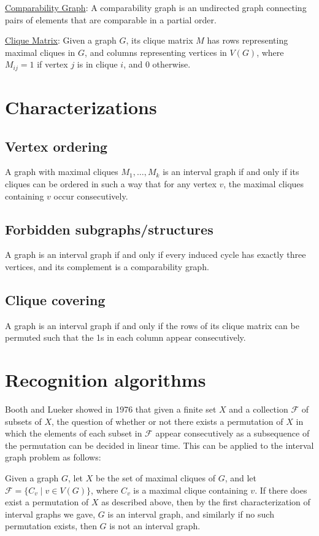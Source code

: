 \documentclass[11pt]{article}
\begin{document}
\noindent
\underline{Comparability Graph}: A comparability graph is an undirected graph
connecting pairs of elements that are comparable in a partial order.

\noindent
\underline{Clique Matrix}: Given a graph $G$, its clique matrix $M$ has rows
representing maximal cliques in $G$, and columns representing vertices in
$V(G)$, where $M_{ij}=1$ if vertex $j$ is in clique $i$, and 0 otherwise.


\section{Characterizations}
\subsection{Vertex ordering}
A graph with maximal cliques $M_1,\ldots,M_k$ is an interval graph if and only
if its cliques can be ordered in such a way that for any vertex $v$, the
maximal cliques containing $v$ occur consecutively. \cite{Golumbic}


\subsection{Forbidden subgraphs/structures}
A graph is an interval graph if and only if every induced cycle has exactly
three vertices, and its complement is a comparability graph. \cite{West}


\subsection{Clique covering}
A graph is an interval graph if and only if the rows of its clique matrix can
be permuted such that the 1s in each column appear consecutively. \cite{Fulkerson}


\section{Recognition algorithms}
Booth and Lueker\cite{Booth} showed in 1976 that given a finite set $X$ and a
collection $\mathcal{F}$ of subsets of $X$, the question of whether or not
there exists a permutation of $X$ in which the elements of each subset in
$\mathcal{F}$ appear consecutively as a subsequence of the permutation can be
decided in linear time. This can be applied to the interval graph problem as
follows:

Given a graph $G$, let $X$ be the set of maximal cliques of $G$, and let
$\mathcal{F}=\{C_v\mid v\in V(G)\}$, where $C_v$ is a maximal clique
containing $v$. If there does exist a permutation of $X$ as described above,
then by the first characterization of interval graphs we gave, $G$ is an
interval graph, and similarly if no such permutation exists, then $G$ is not
an interval graph.
\end{document}
